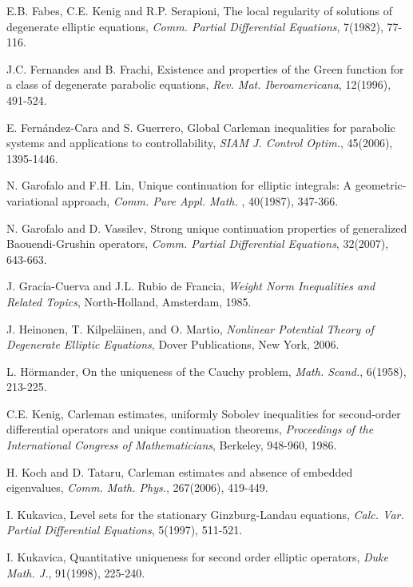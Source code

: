 \documentclass[11pt]{article}
\numberwithin{equation}{section}
\begin{document}
\begin{thebibliography}{}
	E.B. Fabes, C.E. Kenig and R.P. Serapioni, The local regularity of solutions of degenerate elliptic equations, {\it Comm. Partial Differential Equations}, 7(1982), 77-116.
	
	 J.C. Fernandes and B. Frachi, Existence and properties of the Green function for a class of degenerate parabolic equations, {\it Rev. Mat. Iberoamericana}, 12(1996), 491-524.


	
	E. Fern\'andez-Cara and S. Guerrero, Global Carleman inequalities for parabolic systems and applications to controllability, {\it SIAM J. Control Optim.}, 45(2006), 1395-1446.
	
	N. Garofalo and F.H. Lin, Unique continuation for elliptic integrals: A geometric-variational approach,
	{\it  Comm. Pure Appl. Math. }, 40(1987), 347-366.
	
	N. Garofalo and D. Vassilev, Strong unique continuation properties of generalized Baouendi-Grushin operators,
	{\it  Comm. Partial Differential Equations}, 32(2007), 643-663.
	
	J. Grac\'ia-Cuerva and J.L. Rubio de Francia, {\it Weight Norm Inequalities and Related Topics}, North-Holland, Amsterdam, 1985.
	
	J. Heinonen, T. Kilpel\"ainen, and O. Martio, {\it Nonlinear Potential Theory of Degenerate Elliptic Equations}, Dover Publications, New York, 2006.
	
	L. H\"ormander, On the uniqueness of the Cauchy problem, {\it Math. Scand.}, 6(1958), 213-225.
	
	C.E. Kenig, Carleman estimates, uniformly Sobolev inequalities for second-order differential operators and unique continuation theorems,
	{\it Proceedings of the International Congress of Mathematicians}, Berkeley, 948-960, 1986.
	
	H. Koch and D. Tataru, {Carleman estimates and absence of embedded eigenvalues}, {\it Comm. Math. Phys.}, 267(2006), 419-449.
	
	I. Kukavica, Level sets for the stationary Ginzburg-Landau equations,
	{\it Calc. Var. Partial Differential Equations}, 5(1997), 511-521.
	
	I. Kukavica, Quantitative uniqueness for second order elliptic operators,
	{\it Duke Math. J.}, 91(1998), 225-240.
	

\end{thebibliography}
\end{document}
